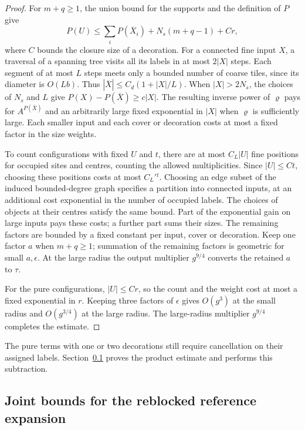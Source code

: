 \documentclass[11pt]{article}
\theoremstyle{definition}
\begin{document}
\begin{proof}
For \(m+q\ge1\), the union bound for the supports and the definition
of \(P\) give
\begin{equation}
 P(U)\le\sum_iP(\overline X_i)+N_s(m+q-1)+C r ,
\end{equation}
where \(C\) bounds the closure size of a decoration. For a connected
fine input \(X\), a traversal of a spanning tree visits all its
labels in at most \(2|X|\) steps. Each segment of at most \(L\)
steps meets only a bounded number of coarse tiles, since its diameter
is \(O(Lb)\). Thus \(|\overline X|\le C_d(1+|X|/L)\).
When \(|X|>2N_s\), the choices of \(N_s\) and \(L\) give
\(P(X)-P(\overline X)\ge c|X|\).
The resulting inverse power of \(\varrho\) pays for
\(A^{P(\overline X)}\) and an arbitrarily large fixed exponential
in \(|X|\) when \(\varrho\) is sufficiently large. Each smaller input
and each cover or decoration costs at most a fixed factor in the
size weights.

To count configurations with fixed \(U\) and \(t\), there are at most
\(C_L|U|\) fine positions for occupied sites and centres, counting
the allowed multiplicities. Since \(|U|\le Ct\), choosing these
positions costs at most \(C_L'{}^t\). Choosing an edge subset of
the induced bounded-degree graph specifies a partition into connected
inputs, at an additional cost exponential in the number of occupied
labels. The choices of objects at their centres satisfy the same
bound. Part of the exponential gain on large inputs pays these
costs; a further part sums their sizes. The remaining factors are
bounded by a fixed constant per input, cover or decoration. Keep
one factor \(a\) when \(m+q\ge1\); summation of the remaining factors
is geometric for small \(a,\epsilon\). At the large radius the
output multiplier \(g^{9/4}\) converts the retained \(a\) to \(\tau\).

For the pure configurations, \(|U|\le Cr\), so the count and the
weight cost at most a fixed exponential in \(r\). Keeping three
factors of \(\epsilon\) gives \(O(g^3)\) at the small radius and
\(O(g^{3/4})\) at the large radius. The large-radius multiplier
\(g^{9/4}\) completes the estimate.
\end{proof}

The pure terms with one or two decorations still require cancellation
on their assigned labels. Section~\ref{sec:cube-joint-reblocking}
proves the product estimate and performs this subtraction.

\subsection{Joint bounds for the reblocked reference expansion}
\label{sec:cube-joint-reblocking}
\end{document}
